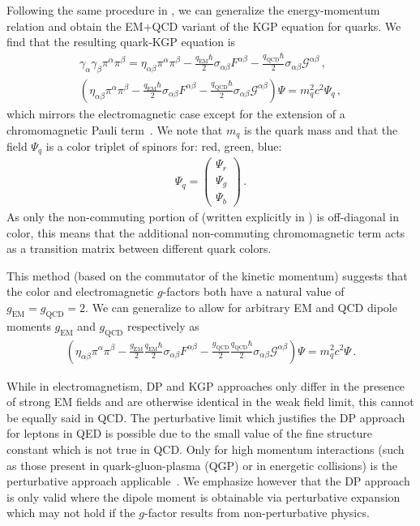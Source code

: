 Following the same procedure in , we can generalize the energy-momentum relation and obtain the EM+QCD variant of the KGP equation for quarks. We find that the resulting quark-KGP equation is
\begin{align}
    \label{eq:spin:11a}
    \gamma_{\alpha}\gamma_{\beta}\pi^{\alpha}\pi^{\beta} = \eta_{\alpha\beta}\pi^{\alpha}\pi^{\beta} - 
    \frac{q_\mathrm{EM}\hbar}{2}\sigma_{\alpha\beta}F^{\alpha\beta} - 
    \frac{q_\mathrm{QCD}\hbar}{2}\sigma_{\alpha\beta}\mathcal{G}^{\alpha\beta}\,,\\
	\label{eq:spin:11b} \left(\eta_{\alpha\beta}\pi^{\alpha}\pi^{\beta} - 
    \frac{q_\mathrm{EM}\hbar}{2}\sigma_{\alpha\beta}F^{\alpha\beta} - 
    \frac{q_\mathrm{QCD}\hbar}{2}\sigma_{\alpha\beta}\mathcal{G}^{\alpha\beta}\right)\Psi=m_{q}^{2}c^{2}\Psi_{q}\,,
\end{align}
which mirrors the electromagnetic case except for the extension of a chromomagnetic Pauli term~\citep{Morgan:1995te}. We note that $m_{q}$ is the quark mass and that the field $\Psi_{q}$ is a color triplet of spinors for: red, green, blue:
\begin{align}
    \Psi_{q}=
    \begin{pmatrix}
        \Psi_{r}\\
        \Psi_{g}\\
        \Psi_{b}
    \end{pmatrix}\,.
\end{align}
As only the non-commuting portion of  (written explicitly in ) is off-diagonal in color, this means that the additional non-commuting chromomagnetic term acts as a transition matrix between different quark colors.

This method (based on the commutator of the kinetic momentum) suggests that the color and electromagnetic $g$-factors both have a natural value of $g_\mathrm{EM}\!=\!g_\mathrm{QCD}\!=\!2$. We can generalize  to allow for arbitrary EM and QCD dipole moments $g_\mathrm{EM}$ and $g_\mathrm{QCD}$ respectively as
\begin{align}
	\label{eq:spin:12}
    \boxed{\left(\eta_{\alpha\beta}\pi^{\alpha}\pi^{\beta}-\frac{g_\mathrm{EM}}{2}\frac{q_\mathrm{EM}\hbar}{2}\sigma_{\alpha\beta}F^{\alpha\beta}-\frac{g_\mathrm{QCD}}{2}\frac{q_\mathrm{QCD}\hbar}{2}\sigma_{\alpha\beta}\mathcal{G}^{\alpha\beta}\right)\Psi=m_{q}^{2}c^{2}\Psi}\,.
\end{align}


While in electromagnetism, DP and KGP approaches only differ in the presence of strong EM fields and are otherwise identical in the weak field limit, this cannot be equally said in QCD. The perturbative limit which justifies the DP approach for leptons in QED is possible due to the small value of the fine structure constant which is not true in QCD. Only for high momentum interactions (such as those present in quark-gluon-plasma (QGP) or in energetic collisions) is the perturbative approach applicable~\citep{Choudhury:2014lna}. We emphasize however that the DP approach is only valid where the dipole moment is obtainable via perturbative expansion which may not hold if the $g$-factor results from non-perturbative physics.

